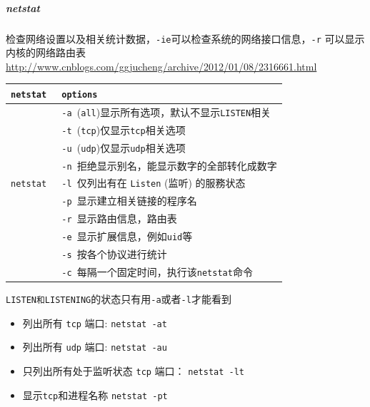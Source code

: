 \documentclass[UTF8,a4paper,12pt]{ctexbook}
\begin{document}
			\subparagraph{netstat} 检查网络设置以及相关统计数据，\verb|-ie|可以检查系统的网络接口信息，\verb|-r| 可以显示内核的网络路由表
				\url{http://www.cnblogs.com/ggjucheng/archive/2012/01/08/2316661.html}
				
				\begin{table}[H]
					\centering
					\begin{tabular}{l|m{12cm}}
						\hline
						\verb|netstat |   	   & \verb|options| \\
						\hline
						\verb| |   	   & \verb|-a |(\verb|all|)显示所有选项，默认不显示\verb|LISTEN|相关 \\
						\verb| |   	   & \verb|-t |(\verb|tcp|)仅显示\verb|tcp|相关选项\\
						\verb| |   	   & \verb|-u |(\verb|udp|)仅显示\verb|udp|相关选项 \\
						\verb| |   	   & \verb|-n |拒绝显示别名，能显示数字的全部转化成数字 \\
						\verb|netstat |   	   & \verb|-l |仅列出有在 \verb|Listen| (监听) 的服務状态\\
						\verb| |   	   & \verb|-p |显示建立相关链接的程序名 \\
						\verb| |   	   & \verb|-r |显示路由信息，路由表 \\
						\verb| |   	   & \verb|-e |显示扩展信息，例如\verb|uid|等\\
						\verb| |   	   & \verb|-s |按各个协议进行统计 \\
						\verb| |   	   & \verb|-c |每隔一个固定时间，执行该\verb|netstat|命令\\
						\hline
					\end{tabular}
				\end{table}	
					
				\verb|LISTEN和LISTENING|的状态只有用\verb|-a|或者\verb|-l|才能看到
				
				\begin{itemize}[itemindent = 1em]
					\item 列出所有 \verb|tcp| 端口: \verb|netstat -at|
					\item 列出所有 \verb|udp| 端口: \verb|netstat -au|
					\item 只列出所有处于监听状态 \verb|tcp| 端口： \verb|netstat -lt|
					\item 显示\verb|tcp|和进程名称 \verb|netstat -pt|
				\end{itemize}
				
\end{document}
